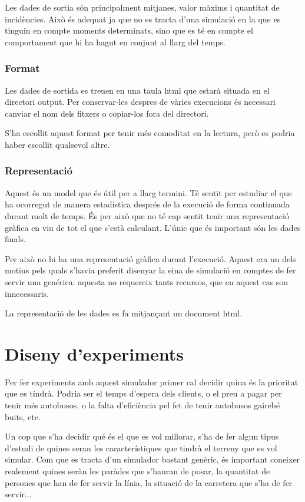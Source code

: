 \documentclass[a4paper,10pt]{article}
\begin{document}
Les dades de sortia són principalment mitjanes, valor màxims i quantitat de incidències. Això és adequat ja que no es tracta d'una simulació en la que es tinguin en compte moments determinats, sino que es té en compte el comportament que hi ha hagut en conjunt al llarg del temps.


\subsubsection{Format}

Les dades de sortida es treuen en una taula html que estarà situada en el directori output. Per conservar-les despres de vàries execucions és necessari canviar el nom dels fitxers o copiar-los fora del directori.

S'ha escollit aquest format per tenir més comoditat en la lectura, però es podria haber escollit qualsevol altre.


\subsubsection{Representació}

Aquest és un model que és útil per a llarg termini. Té sentit per estudiar el que ha ocorregut de manera estadística després de la execució de forma continuada durant molt de temps. És per això que no té cap sentit tenir una representació gràfica en viu de tot el que s'està calculant. L'únic que és important són les dades finals.

Per això no hi ha una representació gràfica durant l'execució. Aquest era un dels motius pels quals s'havia preferit disenyar la eina de simulació en comptes de fer servir una genérica: aquesta no requereix tants recursos, que en aquest cas son innecessaris.

La representació de les dades es fa mitjançant un document html.


\section{Diseny d'experiments}

Per fer experiments amb aquest simulador primer cal decidir quina és la prioritat que es tindrà. Podria ser el temps d'espera dels clients, o el preu a pagar per tenir més autobusos, o la falta d'eficiència pel fet de tenir autobusos gairebé buits, etc.

Un cop que s'ha decidir qué és el que es vol millorar, s'ha de fer algun tipus d'estudi de quines seran les característiques que tindrà el terreny que es vol simular. Com que es tracta d'un simulador bastant genèric, és important coneixer realement quines seràn les paràdes que s'hauran de posar, la quantitat de persones que han de fer servir la línia, la situació de la carretera que s'ha de fer servir...
\end{document}
